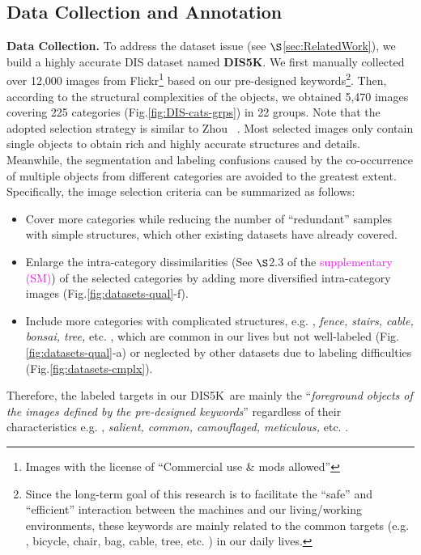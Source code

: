 \subsection{Data Collection and Annotation}\label{sec:DataCol}

\textbf{Data Collection.} To address the dataset issue (see $\S$\ref{sec:RelatedWork}), we build a highly accurate DIS dataset named \textbf{DIS5K}. We first manually collected over 12,000 images from Flickr\footnote{Images with the license of ``Commercial use \& mods allowed''} based on our pre-designed keywords\footnote{Since the long-term goal of this research is to facilitate the ``safe'' and ``efficient'' interaction between the machines and our living/working environments, these keywords are mainly related to the common targets (e.g. , bicycle, chair, bag, cable, tree, etc. ) in our daily lives.}. Then, according to the structural complexities of the objects, we obtained 5,470 images covering 225 categories (Fig.\ref{fig:DIS-cats-grps}) 
in 22 groups. Note that the adopted selection strategy is similar to Zhou \etal~\cite{zhou2017places}. Most selected images only contain single objects to obtain rich and highly accurate structures and details. Meanwhile, the segmentation and labeling confusions caused by the co-occurrence of multiple objects from different categories are avoided to the greatest extent. Specifically, the image selection criteria can be summarized as follows:

\begin{itemize}
    \item[$\bullet$] Cover more categories while reducing the number of ``redundant'' samples with simple structures, which other existing datasets have already covered.

    \item[$\bullet$] Enlarge the intra-category dissimilarities (See $\S$2.3 of the \textcolor{magenta}{supplementary (SM)}) of the selected categories by adding more diversified intra-category images 
    (Fig.\ref{fig:datasets-qual}-f). 

    \item[$\bullet$] Include more categories with complicated structures, e.g. , \textit{fence, stairs, cable, bonsai, tree,} etc. , which are common in our lives but not well-labeled 
    (Fig.\ref{fig:datasets-qual}-a) or neglected by other datasets due to labeling difficulties (Fig.\ref{fig:datasets-cmplx}). 
\end{itemize}

Therefore, the labeled targets in our DIS5K~are mainly the ``\textit{foreground objects of the images defined by the pre-designed keywords}'' regardless of their characteristics e.g. , \textit{salient, common, camouflaged, meticulous,} etc. . 

